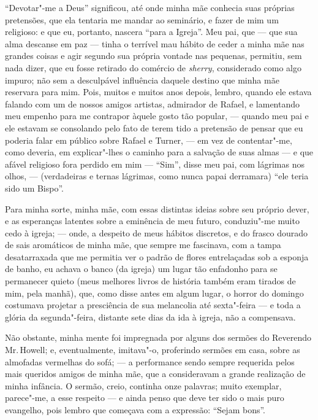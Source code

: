 {{{{{{{{{{{{%
``Devotar"-me a Deus'' significou, até onde minha mãe conhecia suas
próprias pretensões, que ela tentaria me mandar ao seminário, e fazer de
mim um religioso: e que eu, portanto, nascera ``para a Igreja''. Meu
pai, que --- que sua alma descanse em paz --- tinha o terrível mau hábito
de ceder a minha mãe nas grandes coisas e agir segundo sua própria
vontade nas pequenas, permitiu, sem nada dizer, que eu fosse retirado do
comércio de \textit{sherry}, considerado como algo impuro; não sem a
desculpável influência daquele destino que minha mãe reservara para mim.
Pois, muitos e muitos anos depois, lembro, quando ele estava falando com
um de nossos amigos artistas, admirador de Rafael, e lamentando meu
empenho para me contrapor àquele gosto tão popular, --- quando meu pai e
ele estavam se consolando pelo fato de terem tido a pretensão de pensar
que eu poderia falar em público sobre Rafael e Turner, --- em vez de
contentar"-me, como deveria, em explicar"-lhes o caminho para a salvação
de suas almas --- e que afável religioso fora perdido em mim --- ``Sim'',
disse meu pai, com lágrimas nos olhos, --- (verdadeiras e ternas lágrimas,
como nunca papai derramara) ``ele teria sido um Bispo''.

Para minha sorte, minha mãe, com essas distintas ideias sobre seu
próprio dever, e as esperanças latentes sobre a eminência de meu futuro,
conduziu"-me muito cedo à igreja; --- onde, a despeito de meus hábitos
discretos, e do frasco dourado de sais aromáticos de minha mãe, que
sempre me fascinava, com a tampa desatarraxada que me permitia ver o
padrão de flores entrelaçadas sob a esponja de banho, eu achava o banco
(da igreja) um lugar tão enfadonho para se permanecer quieto (meus
melhores livros de história também eram tirados de mim, pela manhã),
que, como disse antes em algum lugar, o horror do domingo costumava
projetar a presciência de sua melancolia até sexta"-feira --- e toda a
glória da segunda"-feira, distante sete dias da ida à igreja, não a
compensava.

Não obstante, minha mente foi impregnada por alguns dos sermões do
Reverendo Mr.\,Howell; e, eventualmente, imitava"-o, proferindo sermões em
casa, sobre as almofadas vermelhas do sofá; --- a performance sendo sempre
requerida pelos mais queridos amigos de minha mãe, que a consideravam a
grande realização de minha infância. O sermão, creio, continha onze
palavras; muito exemplar, parece"-me, a esse respeito --- e ainda penso
que deve ter sido o mais puro evangelho, pois lembro que começava com a
expressão: ``Sejam bons''.

}}}}}}}}}}}}
